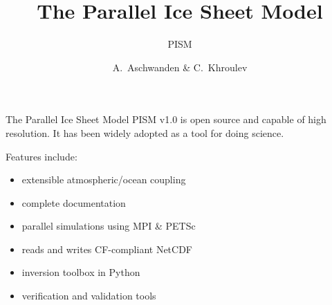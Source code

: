 \documentclass[hide notes,intlimits]{beamer}
\title[PISM] %
{The Parallel Ice Sheet Model}
\subtitle{PISM}
\author[Aschwanden, Khroulev] %
{A.~Aschwanden \& C.~Khroulev}
\date{}
\begin{document}
  {
} 

\begin{frame}
  \titlepage
\end{frame}

  {
} 


\begin{frame}
  The Parallel Ice Sheet Model PISM v1.0 is open source and capable of high resolution. It has been widely adopted as a tool for doing science.
  
  Features include:

  \begin{itemize}
  \item extensible atmospheric/ocean coupling
  \item complete documentation
  \item parallel simulations using MPI \& PETSc
  \item reads and writes CF-compliant NetCDF
  \item inversion toolbox in Python
  \item verification and validation tools
  \end{itemize}
  
\end{frame}
\end{document}

